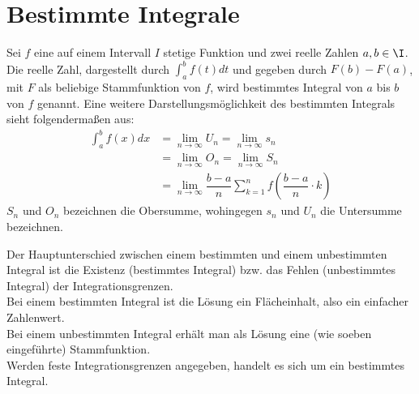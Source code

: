 \section{Bestimmte Integrale}
\begin{Definition}
  Sei $f$ eine auf einem Intervall $I$ stetige Funktion und zwei reelle Zahlen $a,b\in\I$. Die reelle Zahl,
  dargestellt durch  $\displaystyle{\int_a^b f(t)dt}$ und gegeben durch $F(b)-F(a)$, mit $F$ als beliebige Stammfunktion von $f$, wird bestimmtes Integral von $a$ bis $b$ von $f$ genannt.
  Eine weitere Darstellungsmöglichkeit des bestimmten Integrals sieht folgendermaßen aus:
  \begin{align*}
    \int_{a}^{b} f(x)dx & = \lim\limits_{n \rightarrow \infty} U_n = \lim\limits_{n \rightarrow \infty} s_n\\
                        & = \lim\limits_{n \rightarrow \infty} O_n = \lim\limits_{n \rightarrow \infty} S_n\\
                        & = \lim\limits_{n \rightarrow \infty} \dfrac{b-a}{n}\sum\limits_{k=1}^{n}f\left(\dfrac{b-a}{n}\cdot k\right)
  \end{align*}
  $S_n$ und $O_n$ bezeichnen die Obersumme, wohingegen $s_n$ und $U_n$ die Untersumme bezeichnen.
\end{Definition}
\begin{Bemerkung}
  Der Hauptunterschied zwischen einem bestimmten und einem unbestimmten Integral ist die Existenz (bestimmtes Integral) bzw. das Fehlen
  (unbestimmtes Integral) der Integrationsgrenzen.\\
  Bei einem bestimmten Integral ist die Lösung ein Flächeinhalt, also ein einfacher Zahlenwert.\\
  Bei einem unbestimmten Integral erhält man als Lösung eine (wie soeben eingeführte) Stammfunktion.\\
  Werden feste Integrationsgrenzen angegeben, handelt es sich um ein bestimmtes Integral.
\end{Bemerkung}
